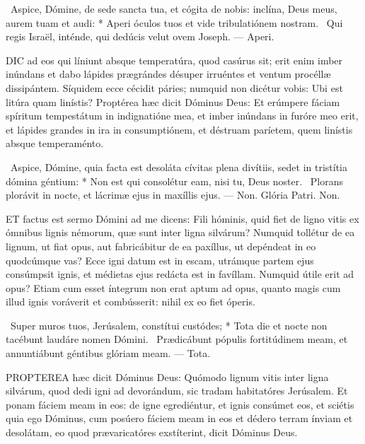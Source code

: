 \R\ Aspice, Dómine, de sede sancta tua, et cógita de nobis: inclína, Deus meus, aurem tuam et audi: * Aperi óculos tuos et vide tribulatiónem nostram. \V\ Qui regis Israël, inténde, qui dedúcis velut ovem Joseph. — Aperi.



\lettrine[lines=2]{D}{IC} ad eos qui líniunt absque temperatúra, quod casúrus sit; erit enim imber inúndans et dabo lápides prægrándes désuper irruéntes et ventum procéllæ dissipántem. Síquidem ecce cécidit páries; numquid non dicétur vobis: Ubi est litúra quam linístis? Proptérea hæc dicit Dóminus Deus: Et erúmpere fáciam spíritum tempestátum in indignatióne mea, et imber inúndans in furóre meo erit, et lápides grandes in ira in consumptiónem, et déstruam paríetem, quem linístis absque temperaménto.

\R\ Aspice, Dómine, quia facta est desoláta cívitas plena divítiis, sedet in tristítia dómina géntium: * Non est qui consolétur eam, nisi tu, Deus noster. \V\ Plorans plorávit in nocte, et lácrimæ ejus in maxíllis ejus. — Non. Glória Patri. Non.




\lettrine[lines=2]{E}{T} factus est sermo Dómini ad me dicens: Fili hóminis, quid fiet de ligno vitis ex ómnibus lignis némorum, quæ sunt inter ligna silvárum? Numquid tollétur de ea lignum, ut fiat opus, aut fabricábitur de ea paxíllus, ut depéndeat in eo quodcúmque vas? Ecce igni datum est in escam, utrámque partem ejus consúmpsit ignis, et médietas ejus redácta est in favíllam. Numquid útile erit ad opus? Etiam cum esset íntegrum non erat aptum ad opus, quanto magis cum illud ignis voráverit et combússerit: nihil ex eo fiet óperis.

\R\ Super muros tuos, Jerúsalem, constítui custódes; * Tota die et nocte non tacébunt laudáre nomen Dómini. \V\ Prædicábunt pópulis fortitúdinem meam, et annuntiábunt géntibus glóriam meam. — Tota.


\lettrine[lines=2]{P}{ROPTEREA} hæc dicit Dóminus Deus: Quómodo lignum vitis inter ligna silvárum, quod dedi igni ad devorándum, sic tradam habitatóres Jerúsalem. Et ponam fáciem meam in eos: de igne egrediéntur, et ignis consúmet eos, et sciétis quia ego Dóminus, cum posúero fáciem meam in eos et dédero terram ínviam et desolátam, eo quod prævaricatóres exstíterint, dicit Dóminus Deus.


